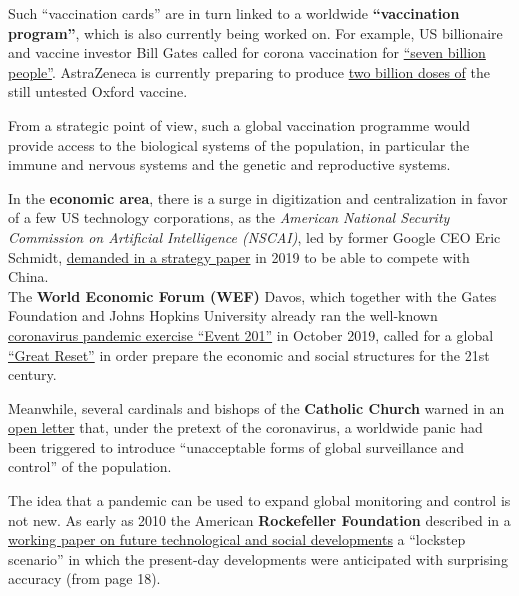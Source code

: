 Such ``vaccination cards'' are in turn linked to a worldwide
\textbf{``vaccination program''}, which is also currently being worked
on. For example, US billionaire and vaccine investor Bill Gates called
for corona vaccination for
\href{https://www.businessinsider.com/bill-gates-14-billion-doses-coronavirus-vaccine-may-be-needed-2020-5}{``seven
billion people''}. AstraZeneca is currently preparing to produce
\href{https://www.sciencealert.com/2-billion-doses-of-oxford-s-potential-coronavirus-vaccine-could-soon-become-available}{two
billion doses of} the still untested Oxford vaccine.

From a strategic point of view, such a global vaccination programme
would provide access to the biological systems of the population, in
particular the immune and nervous systems and the genetic and
reproductive systems.

In the \textbf{economic area}, there is a surge in digitization and
centralization in favor of a few US technology corporations, as the
\emph{American} \emph{National Security Commission on Artificial
Intelligence (NSCAI)}, led by former Google CEO Eric Schmidt,
\href{http://unlimitedhangout.com/2020/05/reports/techno-tyranny-how-the-us-national-security-state-is-using-coronavirus-to-fulfill-an-orwellian-vision/}{demanded
in a strategy paper} in 2019 to be able to compete with China.\\

The \textbf{World Economic Forum (WEF)} Davos, which together with the
Gates Foundation and Johns Hopkins University already ran the well-known
\href{https://www.centerforhealthsecurity.org/event201/scenario.html}{coronavirus
pandemic exercise ``Event 201''} in October 2019, called for a global
\href{https://www.youtube.com/watch?v=u5pxhSnDr4U}{``Great Reset''} in
order prepare the economic and social structures for the 21st century.

Meanwhile, several cardinals and bishops of the \textbf{Catholic Church}
warned in an \href{https://veritasliberabitvos.info/appeal/}{open
letter} that, under the pretext of the coronavirus, a worldwide panic
had been triggered to introduce ``unacceptable forms of global
surveillance and control'' of the population.

The idea that a pandemic can be used to expand global monitoring and
control is not new. As early as 2010 the American \textbf{Rockefeller
Foundation} described in a
\href{https://swprs.files.wordpress.com/2020/04/rockefeller-foundation-scenarios-2010.pdf}{working
paper on future technological and social developments} a ``lockstep
scenario'' in which the present-day developments were anticipated with
surprising accuracy (from page 18).

